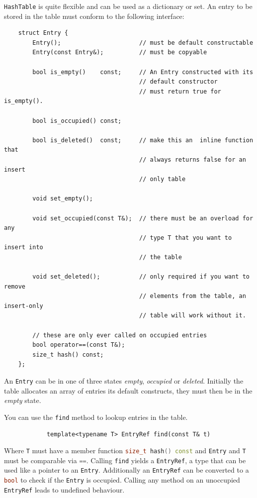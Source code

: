 \documentclass[12pt,a4paper,oneside]{article}
\newcommand{\cpp}[1]{\lstinline[language=C++]{#1}}
\begin{document}
	\cpp{HashTable} is quite flexible and can be used as a dictionary or set.
	An entry to be stored in the table must conform to the following interface:
		\begin{lstlisting}
	struct Entry {
		Entry();                      // must be default constructable
		Entry(const Entry&);          // must be copyable

		bool is_empty()    const;     // An Entry constructed with its 
		                              // default constructor
		                              // must return true for is_empty().

		bool is_occupied() const;

		bool is_deleted()  const;     // make this an  inline function that
		                              // always returns false for an insert
		                              // only table

		void set_empty();

		void set_occupied(const T&);  // there must be an overload for any
		                              // type T that you want to insert into
		                              // the table

		void set_deleted();           // only required if you want to remove
		                              // elements from the table, an insert-only
		                              // table will work without it.

		// these are only ever called on occupied entries
		bool operator==(const T&);
		size_t hash() const;
	};
		\end{lstlisting}

	An \cpp{Entry} can be in one of three states \emph{empty}, \emph{occupied} or \emph{deleted}.
	Initially the table allocates an array of entries its default constructs, they must then be in the \emph{empty} state.


	You can use the \cpp{find} method to lookup entries in the table.
		\begin{lstlisting}
			template<typename T> EntryRef find(const T& t)
		\end{lstlisting}
	Where \cpp{T} must have a member function \cpp{size_t hash() const} and \cpp{Entry} and \cpp{T} must be comparable via \cpp{==}.
	Calling \cpp{find} yields a \cpp{EntryRef}, a type that can be used like a pointer to an \cpp{Entry}.
	Additionally an \cpp{EntryRef} can be converted to a \cpp{bool} to check if the \cpp{Entry} is occupied.
	Calling any method on an unoccupied \cpp{EntryRef} leads to undefined behaviour.
\end{document}
